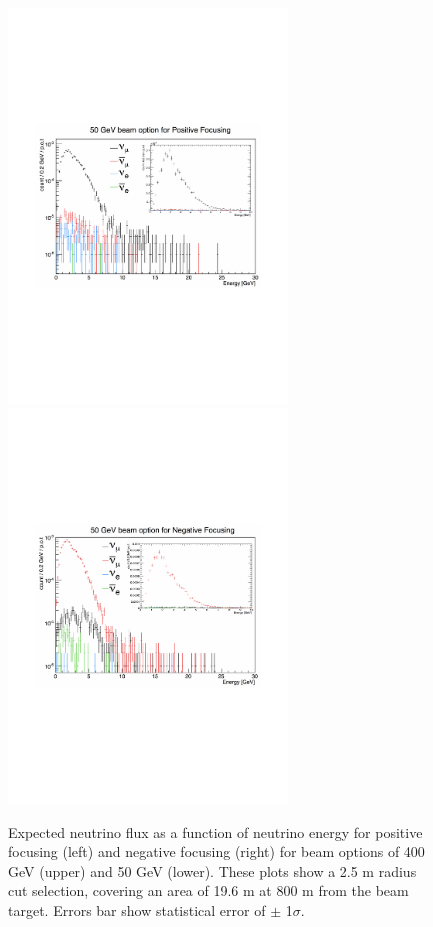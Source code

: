\begin{figure}[htbp]
\begin{center}
		\includegraphics[width=74mm]{Chapter3/figures/50_PF_800m_2o5mRadius_allFlav_combined.pdf}
		\includegraphics[width=74mm]{Chapter3/figures/50_NF_800m_2o5mRadius_allFlav_combined.pdf}
		\caption{Expected neutrino flux as a function of neutrino energy for positive focusing (left) and negative focusing (right) for beam options of 400 GeV (upper) and 50 GeV (lower). These plots show a 2.5 m radius cut selection, covering an area of 19.6 m at 800 m from the beam target. Errors bar show statistical error of $\pm$ 1$\sigma$. }
		\label{fig:neutrinoFluxND}
	\end{center}
\end{figure}

